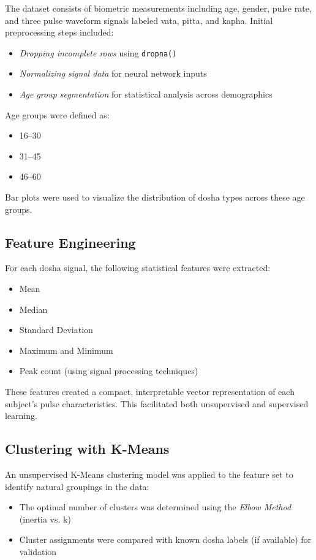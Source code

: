 \documentclass[10pt,twocolumn]{article}
\begin{document}
The dataset consists of biometric measurements including age, gender, pulse rate, and three pulse waveform signals labeled vata, pitta, and kapha. Initial preprocessing steps included:
\begin{itemize}
    \item \textit{Dropping incomplete rows} using \texttt{dropna()}
    \item \textit{Normalizing signal data} for neural network inputs
    \item \textit{Age group segmentation} for statistical analysis across demographics
\end{itemize}

Age groups were defined as:
\begin{itemize}
    \item 16–30
    \item 31–45
    \item 46–60
\end{itemize}

Bar plots were used to visualize the distribution of dosha types across these age groups.

\subsection{Feature Engineering}

For each dosha signal, the following statistical features were extracted:
\begin{itemize}
    \item Mean
    \item Median
    \item Standard Deviation
    \item Maximum and Minimum
    \item Peak count (using signal processing techniques)
\end{itemize}

These features created a compact, interpretable vector representation of each subject's pulse characteristics. This facilitated both unsupervised and supervised learning.

\subsection{Clustering with K-Means}

An unsupervised K-Means clustering model was applied to the feature set to identify natural groupings in the data:
\begin{itemize}
    \item The optimal number of clusters was determined using the \textit{Elbow Method} (inertia vs. k)
    \item Cluster assignments were compared with known dosha labels (if available) for validation
\end{itemize}
\end{document}
